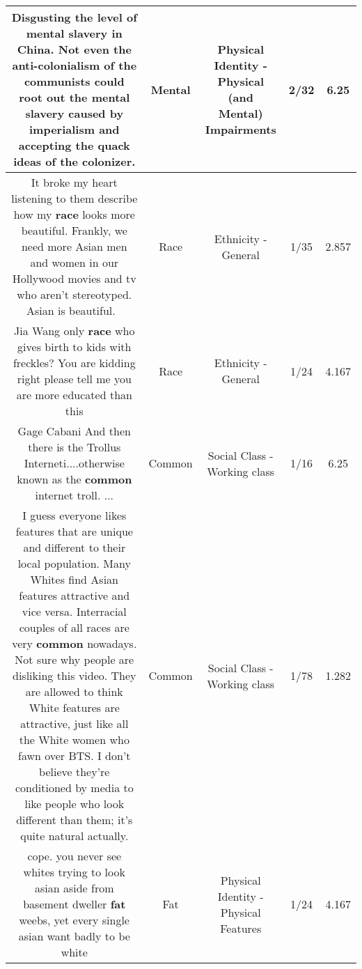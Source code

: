\documentclass[11pt]{article}
\newlength\mylength
\begin{document}
\begin{center}
\begin{longtable}{|C{.65\mylength}|C{.30\mylength}|C{.12\mylength}|C{.12\mylength}|C{.12\mylength}|}
  \small Disgusting the level of \textbf{mental} slavery in China. Not even the anti-colonialism of the communists could root out the \textbf{mental} slavery caused by imperialism and accepting the quack ideas of the colonizer.\normalsize   & Mental & Physical Identity - Physical (and Mental) Impairments & 2/32 & 6.25 \\  \hline
  \small It broke my heart listening to them describe how my \textbf{race} looks more beautiful. Frankly, we need more Asian men and women in our Hollywood movies and tv who aren't stereotyped. Asian is beautiful. 💖\normalsize   & Race & Ethnicity - General & 1/35 & 2.857 \\  \hline
  \small Jia Wang only \textbf{race} who gives birth to kids with freckles? You are kidding right please tell me you are more educated than this\normalsize   & Race & Ethnicity - General & 1/24 & 4.167 \\  \hline
  \small Gage Cabani  And then there is the Trollus Interneti....otherwise known as the \textbf{common} internet troll. ...\normalsize   & Common & Social Class - Working class & 1/16 & 6.25 \\  \hline
  \small I guess everyone likes features that are unique and different to their local population. Many Whites find Asian features attractive and vice versa. Interracial couples of all races are very \textbf{common} nowadays. Not sure why people are disliking this video. They are allowed to think White features are attractive, just like all the White women who fawn over BTS.  I don't believe they're conditioned by media to like people who look different than them; it's quite natural actually.\normalsize   & Common & Social Class - Working class & 1/78 & 1.282 \\  \hline
  \small cope. you never see whites trying to look asian aside from basement dweller \textbf{fat} weebs, yet every single asian want badly to be white\normalsize   & Fat & Physical Identity - Physical Features & 1/24 & 4.167 \\  \hline

\end{longtable}
\end{center}
\end{document}
